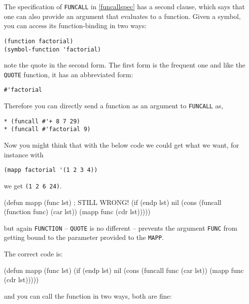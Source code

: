 \documentclass[a4paper,11pt]{article}
\begin{document}
\begin{uenum}
\begin{uenumi}
\begin{uenumi}
\item The specification of \Verb+FUNCALL+ in \ref{funcallspec} has a second clause, which says that one can also provide an argument that evaluates to a function. Given a symbol, you can access its function-binding in two ways:

\begin{ucodeframe}
\begin{Verbatim}
(function factorial)
(symbol-function 'factorial)
\end{Verbatim}
\end{ucodeframe}

note the quote in the second form. The first form is the frequent one and like the \Verb+QUOTE+ function, it has an abbreviated form:

\begin{ucodeframe}
\begin{Verbatim}
#'factorial
\end{Verbatim}
\end{ucodeframe}

Therefore you can directly send a function as an argument to \Verb+FUNCALL+ as,

\begin{ucodeframe}
\begin{Verbatim}
* (funcall #'+ 8 7 29)
* (funcall #'factorial 9)
\end{Verbatim}
\end{ucodeframe}

\end{uenumi}


\item\label{stillwrong} Now you might think that with the below code we could get what we want, for instance with

\Verb+(mapp factorial '(1 2 3 4))+

we get \Verb+(1 2 6 24)+. 

{\small
\begin{lispcode}
(defun mapp (func lst) ; STILL WRONG!
  (if (endp lst)
	nil
	(cons (funcall (function func) (car lst))
	      (mapp func (cdr lst)))))
\end{lispcode}
}
but again \Verb+FUNCTION+ -- \Verb+QUOTE+ is no different -- prevents the argument 
\Verb+FUNC+ from getting bound to the parameter provided to the \Verb+MAPP+.

The correct code is:

\begin{lispcode}
(defun mapp (func lst)
  (if (endp lst)
	nil
	(cons (funcall func (car lst))
	      (mapp func (cdr lst)))))
\end{lispcode}
and you can call the function in two ways, both are fine:


\end{uenumi}
\end{uenum}
\end{document}
